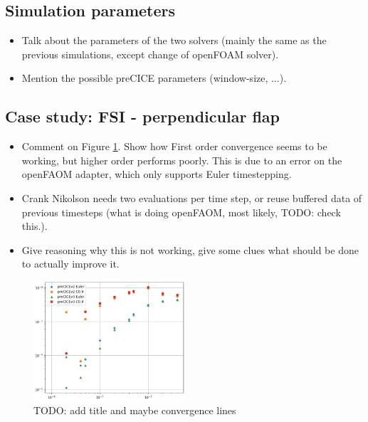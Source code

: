 \documentclass[
  english,        %
  font=times,     %
  onecolumn,      %
]{tumarticle}
\begin{document}
\subsection{Simulation parameters}
    \begin{itemize}
    \item Talk about the parameters of the two solvers (mainly the same as the previous simulations, except change of openFOAM solver). 
    \item Mention the possible preCICE parameters (window-size, ...).
    \end{itemize} 

\subsection{Case study: FSI - perpendicular flap}
\begin{itemize}
    \item Comment on Figure \ref{fig:coupled_v2_v3}. Show how First order convergence seems to be working, but higher order performs poorly. This is due to an error on the openFAOM adapter, which only supports Euler timestepping.
    \item Crank Nikolson needs two evaluations per time step, or reuse buffered data of previous timesteps (what is doing openFAOM, most likely, TODO: check this.).
    \item Give reasoning why this is not working, give some clues what should be done to actually improve it.
\end{itemize}


\begin{figure}[!ht]
    \centering
    \includegraphics[width=0.5\textwidth]{resources/coupled_v2_v3_results.png}
    \caption{TODO: add title and maybe convergence lines}
    \label{fig:coupled_v2_v3}
\end{figure}
\end{document}
